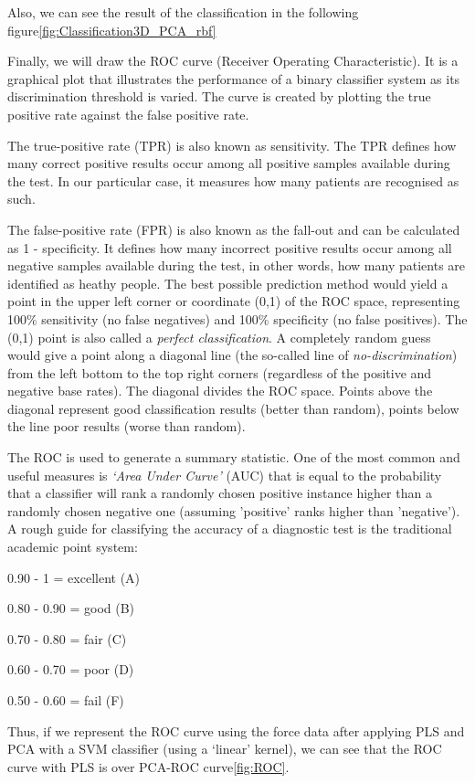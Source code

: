Also, we can see the result of the classification in the following figure\ref{fig:Classification3D_PCA_rbf}

Finally, we will draw the ROC curve (Receiver Operating Characteristic). It  is a graphical plot that illustrates the performance of a binary classifier system as its discrimination threshold is varied. The curve is created by plotting the true positive rate against the false positive rate\cite{ROC1}.

The true-positive rate (TPR) is also known as sensitivity. The TPR defines how many correct positive results occur among all positive samples available during the test. In our particular case, it measures how many patients are recognised as such.

The false-positive rate (FPR) is also known as the fall-out and can be calculated as 1 - specificity. It defines how many incorrect positive results occur among all negative samples available during the test, in other words, how many patients are identified as heathy people.
The best possible prediction method would yield a point in the upper left corner or coordinate (0,1) of the ROC space, representing 100\% sensitivity (no false negatives) and 100\% specificity (no false positives). The (0,1) point is also called a \textit{perfect classification}. A completely random guess would give a point along a diagonal line (the so-called line of \textit{no-discrimination}) from the left bottom to the top right corners (regardless of the positive and negative base rates). The diagonal divides the ROC space. Points above the diagonal represent good classification results (better than random), points below the line poor results (worse than random)\cite{ROC1}.

The ROC is used to generate a summary statistic. One of the most common and useful measures is \textit{‘Area Under Curve’} (AUC) that is equal to the probability that a classifier will rank a randomly chosen positive instance higher than a randomly chosen negative one (assuming 'positive' ranks higher than 'negative'). A rough guide for classifying the accuracy of a diagnostic test is the traditional academic point system\cite{ROC2}:

0.90 - 1 = excellent (A)

0.80 - 0.90 = good (B)	

0.70 - 0.80 = fair (C)

0.60 - 0.70 = poor (D)

0.50 - 0.60 = fail (F)

Thus, if we represent the ROC curve using the force data after applying PLS and PCA with a SVM classifier (using a ‘linear’ kernel), we can see that the ROC curve with PLS is over PCA-ROC curve\ref{fig:ROC}.

